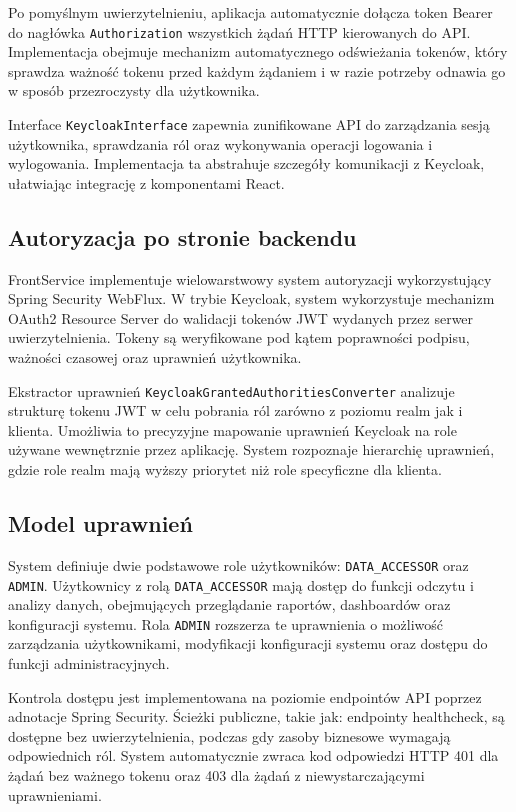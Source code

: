 Po pomyślnym uwierzytelnieniu, aplikacja automatycznie dołącza token Bearer do nagłówka \texttt{Authorization} wszystkich żądań HTTP kierowanych do API. Implementacja obejmuje mechanizm automatycznego odświeżania tokenów, który sprawdza ważność tokenu przed każdym żądaniem i w razie potrzeby odnawia go w sposób przezroczysty dla użytkownika.

Interface \texttt{KeycloakInterface} zapewnia zunifikowane API do zarządzania sesją użytkownika, sprawdzania ról oraz wykonywania operacji logowania i wylogowania. Implementacja ta abstrahuje szczegóły komunikacji z Keycloak, ułatwiając integrację z komponentami React.

\subsection{Autoryzacja po stronie backendu}

FrontService implementuje wielowarstwowy system autoryzacji wykorzystujący Spring Security WebFlux. W trybie Keycloak, system wykorzystuje mechanizm OAuth2 Resource Server do walidacji tokenów JWT wydanych przez serwer uwierzytelnienia. Tokeny są weryfikowane pod kątem poprawności podpisu, ważności czasowej oraz uprawnień użytkownika.

Ekstractor uprawnień \texttt{KeycloakGrantedAuthoritiesConverter} analizuje strukturę tokenu JWT w celu pobrania ról zarówno z poziomu realm jak i klienta. Umożliwia to precyzyjne mapowanie uprawnień Keycloak na role używane wewnętrznie przez aplikację. System rozpoznaje hierarchię uprawnień, gdzie role realm mają wyższy priorytet niż role specyficzne dla klienta.

\subsection{Model uprawnień}

System definiuje dwie podstawowe role użytkowników: \texttt{DATA\_ACCESSOR} oraz \texttt{ADMIN}. Użytkownicy z rolą \texttt{DATA\_ACCESSOR} mają dostęp do funkcji odczytu i analizy danych, obejmujących przeglądanie raportów, dashboardów oraz konfiguracji systemu. Rola \texttt{ADMIN} rozszerza te uprawnienia o możliwość zarządzania użytkownikami, modyfikacji konfiguracji systemu oraz dostępu do funkcji administracyjnych.

Kontrola dostępu jest implementowana na poziomie endpointów API poprzez adnotacje Spring Security. Ścieżki publiczne, takie jak: endpointy healthcheck, są dostępne bez uwierzytelnienia, podczas gdy zasoby biznesowe wymagają odpowiednich ról. System automatycznie zwraca kod odpowiedzi HTTP 401 dla żądań bez ważnego tokenu oraz 403 dla żądań z niewystarczającymi uprawnieniami.

